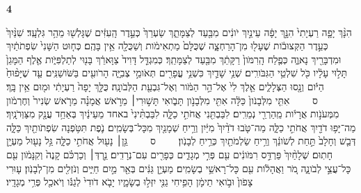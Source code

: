 \documentclass[a4paper]{article}
\newcommand{\rdrchap}[1]{\begin{english}\setRL\small\textbf{#1}\end{english}}
\newcommand{\rdrverse}[1]{\raisebox{2.5pt}{\smaller[4]#1}}
\newcommand{\setuma}{~~~~{\scriptsize ס}~~~~}
\begin{document}
\begin{hebrew}
\begin{multicols}{2}
\rdrchap{4}\rdrverse{1} הִנָּ֨ךְ יָפָ֤ה רַעְיָתִי֙ הִנָּ֣ךְ יָפָ֔ה עֵינַ֣יִךְ יֹונִ֔ים מִבַּ֖עַד לְצַמָּתֵ֑ךְ שַׂעְרֵךְ֙ כְּעֵ֣דֶר הָֽעִזִּ֔ים שֶׁגָּלְשׁ֖וּ מֵהַ֥ר גִּלְעָֽד׃ 
\rdrverse{2} שִׁנַּ֨יִךְ֙ כְּעֵ֣דֶר הַקְּצוּבֹ֔ות שֶׁעָל֖וּ מִן־הָרַחְצָ֑ה שֶׁכֻּלָּם֙ מַתְאִימֹ֔ות וְשַׁכֻּלָ֖ה אֵ֥ין בָּהֶֽם׃ 
\rdrverse{3} כְּח֤וּט הַשָּׁנִי֙ שִׂפְתֹתַ֔יִךְ וּמִדְבָּרֵ֖יךְ נָאוֶ֑ה כְּפֶ֤לַח הָֽרִמֹּון֙ רַקָּתֵ֔ךְ מִבַּ֖עַד לְצַמָּתֵֽךְ׃ 
\rdrverse{4} כְּמִגְדַּ֤ל דָּוִיד֙ צַוָּארֵ֔ךְ בָּנ֖וּי לְתַלְפִּיֹּ֑ות אֶ֤לֶף הַמָּגֵן֙ תָּל֣וּי עָלָ֔יו כֹּ֖ל שִׁלְטֵ֥י הַגִּבֹּורִֽים׃ 
\rdrverse{5} שְׁנֵ֥י שָׁדַ֛יִךְ כִּשְׁנֵ֥י עֳפָרִ֖ים תְּאֹומֵ֣י צְבִיָּ֑ה הָרֹועִ֖ים בַּשֹּׁושַׁנִּֽים׃ 
\rdrverse{6} עַ֤ד שֶׁיָּפ֨וּחַ֙ הַיֹּ֔ום וְנָ֖סוּ הַצְּלָלִ֑ים אֵ֤לֶךְ לִי֙ אֶל־הַ֣ר הַמֹּ֔ור וְאֶל־גִּבְעַ֖ת הַלְּבֹונָֽה׃ 
\rdrverse{7} כֻּלָּ֤ךְ יָפָה֙ רַעְיָתִ֔י וּמ֖וּם אֵ֥ין בָּֽךְ׃ \setuma{} 
\rdrverse{8} אִתִּ֤י מִלְּבָנֹון֙ כַּלָּ֔ה אִתִּ֖י מִלְּבָנֹ֣ון תָּבֹ֑ואִי תָּשׁ֣וּרִי׀ מֵרֹ֣אשׁ אֲמָנָ֗ה מֵרֹ֤אשׁ שְׂנִיר֙ וְחֶרְמֹ֔ון מִמְּעֹנֹ֣ות אֲרָיֹ֔ות מֵֽהַרְרֵ֖י נְמֵרִֽים׃ 
\rdrverse{9} לִבַּבְתִּ֖נִי אֲחֹתִ֣י כַלָּ֑ה לִבַּבְתִּ֨ינִי֙ באחד מֵעֵינַ֔יִךְ בְּאַחַ֥ד עֲנָ֖ק מִצַּוְּרֹנָֽיִךְ׃ 
\rdrverse{10} מַה־יָּפ֥וּ דֹדַ֖יִךְ אֲחֹתִ֣י כַלָּ֑ה מַה־טֹּ֤בוּ דֹדַ֨יִךְ֙ מִיַּ֔יִן וְרֵ֥יחַ שְׁמָנַ֖יִךְ מִכָּל־בְּשָׂמִֽים׃ 
\rdrverse{11} נֹ֛פֶת תִּטֹּ֥פְנָה שִׂפְתֹותַ֖יִךְ כַּלָּ֑ה דְּבַ֤שׁ וְחָלָב֙ תַּ֣חַת לְשֹׁונֵ֔ךְ וְרֵ֥יחַ שַׂלְמֹתַ֖יִךְ כְּרֵ֥יחַ לְבָנֹֽון׃ \setuma{} 
\rdrverse{12} גַּ֥ן׀ נָע֖וּל אֲחֹתִ֣י כַלָּ֑ה גַּ֥ל נָע֖וּל מַעְיָ֥ן חָתֽוּם׃ 
\rdrverse{13} שְׁלָחַ֨יִךְ֙ פַּרְדֵּ֣ס רִמֹּונִ֔ים עִ֖ם פְּרִ֣י מְגָדִ֑ים כְּפָרִ֖ים עִם־נְרָדִֽים׃ 
\rdrverse{14} נֵ֣רְדְּ׀ וְכַרְכֹּ֗ם קָנֶה֙ וְקִנָּמֹ֔ון עִ֖ם כָּל־עֲצֵ֣י לְבֹונָ֑ה מֹ֚ר וַאֲהָלֹ֔ות עִ֖ם כָּל־רָאשֵׁ֥י בְשָׂמִֽים׃ 
\rdrverse{15} מַעְיַ֣ן גַּנִּ֔ים בְּאֵ֖ר מַ֣יִם חַיִּ֑ים וְנֹזְלִ֖ים מִן־לְבָנֹֽון׃ 
\rdrverse{16} ע֤וּרִי צָפֹון֙ וּבֹ֣ואִי תֵימָ֔ן הָפִ֥יחִי גַנִּ֖י יִזְּל֣וּ בְשָׂמָ֑יו יָבֹ֤א דֹודִי֙ לְגַנֹּ֔ו וְיֹאכַ֖ל פְּרִ֥י מְגָדָֽיו׃ 



\end{multicols}
\end{hebrew}
\end{document}
